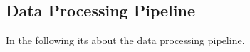 \subsection{Data Processing Pipeline}
\label{subsec:pipeline}
In the following its about the data processing pipeline.






